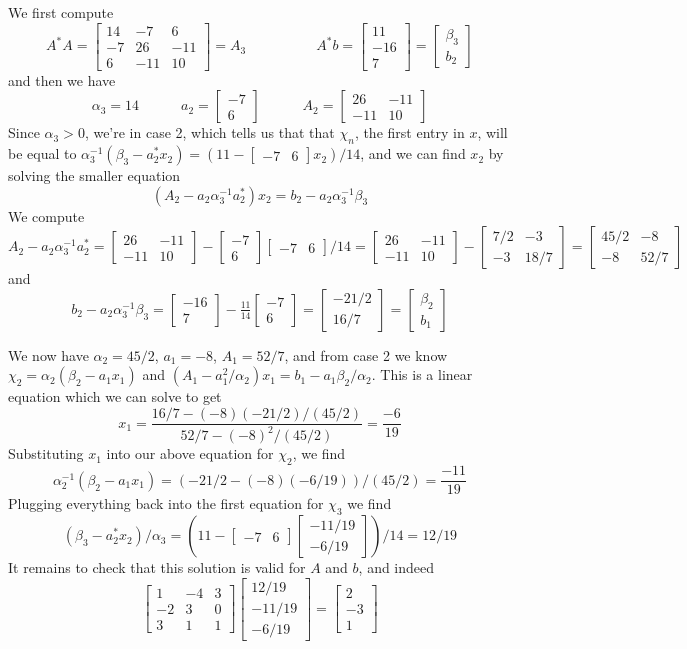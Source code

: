 \documentclass[12pt]{article}
\newcommand{\bmat}[1]{\begin{bmatrix}#1\end{bmatrix}}
\begin{document}
We first compute
$$A^*A = \bmat{14 & -7 & 6\\ -7 & 26 & -11\\6 & -11 & 10} = A_3 \hspace{5em} A^*b =
\bmat{11\\ -16\\ 7} = \bmat{\beta_3\\b_2}$$
and then we have
$$\alpha_3 = 14 \hspace{3em} a_2 = \bmat{-7\\6} \hspace{3em} A_2 = \bmat{26 &
  -11\\-11 & 10}$$
Since $\alpha_3 > 0$, we're in case 2, which tells us that that $\chi_n$, the
first entry in $x$, will be equal to $\alpha_3^{-1}(\beta_3 - a^*_2x_2) = (11 -
\bmat{-7 & 6}x_2)/14$, and we can find $x_2$ by solving the smaller equation
$$ (A_2 - a_2\alpha_3^{-1}a_2^*)x_2 = b_2 - a_2\alpha_3^{-1}\beta_3$$
We compute
$$ A_2 - a_2\alpha_3^{-1} a_2^* = \bmat{26 & -11\\-11 & 10} - \bmat{-7 \\
  6}\bmat{-7&6}/14 = \bmat{26 & -11\\-11 & 10} - \bmat{7/2 & -3\\-3 & 18/7} =
\bmat{45/2 & -8\\-8 & 52/7}$$
and
$$ b_2 - a_2\alpha_3^{-1}\beta_3 = \bmat{-16\\7} - \tfrac{11}{14}\bmat{-7\\6} =
\bmat{-21/2\\ 16/7} = \bmat{\beta_2\\b_1} $$

We now have $\alpha_2 = 45/2$, $a_1 = -8$, $A_1 = 52/7$, and from case 2
we know $\chi_2 = \alpha_2(\beta_2 - a_1x_1)$ and $(A_1 - a_1^2/\alpha_2)x_1
= b_1 - a_1\beta_2/\alpha_2$. This is a linear equation which we can solve to
get
$$ x_1 = \frac{16/7 - (-8)(-21/2)/(45/2)}{52/7 - (-8)^2/(45/2)} =
\frac{-6}{19} $$
Substituting $x_1$ into our above equation for $\chi_2$, we find
$$ \alpha_2^{-1}(\beta_2 - a_1x_1) = (-21/2 - (-8)(-6/19))/(45/2) = \frac{-11}{19} $$
Plugging everything back into the first equation for $\chi_3$ we find
$$(\beta_3 - a_2^*x_2)/\alpha_3 = (11 - \bmat{-7 & 6}\bmat{-11/19\\-6/19})/14
= 12/19$$
It remains to check that this solution is valid for $A$ and $b$, and indeed
$$ \bmat{1 & -4 & 3\\-2 & 3 & 0\\3 & 1 & 1}\bmat{12/19\\-11/19\\-6/19} =
\bmat{2\\ -3 \\ 1}  $$
\end{document}
